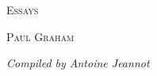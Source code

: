 \begin{titlepage}
    \begin{center}
        \vspace*{2.5in}
        {\Huge\textsc{Essays}\par}
        \vfill
        \begin{flushright}
            {\large\textsc{Paul Graham}\par}
            \vspace{1em}
            {\small\textit{Compiled by Antoine Jeannot}\par}
        \end{flushright}
        \vspace{1.2in}
    \end{center}
\end{titlepage}